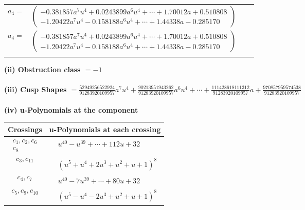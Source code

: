 \documentclass[1p]{elsarticle_modified}
\theoremstyle{definition}
\begin{document}
\begin{tabular}{m{7pt} m{180pt} m{7pt} m{180pt} }
\flushright $a_{4}=$&$\begin{pmatrix}-0.381857 a^{7} u^{4}+0.0243899 a^{6} u^{4}+\cdots+1.70012 a+0.510808\\-1.20422 a^{7} u^{4}-0.158188 a^{6} u^{4}+\cdots+1.44338 a-0.285170\end{pmatrix}$\\ \flushright $a_{4}=$&$\begin{pmatrix}-0.381857 a^{7} u^{4}+0.0243899 a^{6} u^{4}+\cdots+1.70012 a+0.510808\\-1.20422 a^{7} u^{4}-0.158188 a^{6} u^{4}+\cdots+1.44338 a-0.285170\end{pmatrix}$\\&\end{tabular}
\flushleft \textbf{(ii) Obstruction class $= -1$}\\~\\
\flushleft \textbf{(iii) Cusp Shapes $= \frac{52949256522924}{91283920109957} a^7 u^4+\frac{90213951943262}{91283920109957} a^6 u^4+\cdots+\frac{111428618111312}{91283920109957} a+\frac{970857959574538}{91283920109957}$}\\~\\
\newpage\renewcommand{\arraystretch}{1}
\flushleft \textbf{(iv) u-Polynomials at the component}\newline \\
\begin{tabular}{m{50pt}|m{274pt}}
Crossings & \hspace{64pt}u-Polynomials at each crossing \\
\hline $$\begin{aligned}c_{1},c_{2},c_{6}\\c_{8}\end{aligned}$$&$\begin{aligned}
&u^{40}- u^{39}+\cdots+112 u+32
\end{aligned}$\\
\hline $$\begin{aligned}c_{3},c_{11}\end{aligned}$$&$\begin{aligned}
&(u^5+u^4+2 u^3+u^2+u+1)^8
\end{aligned}$\\
\hline $$\begin{aligned}c_{4},c_{7}\end{aligned}$$&$\begin{aligned}
&u^{40}-7 u^{39}+\cdots+80 u+32
\end{aligned}$\\
\hline $$\begin{aligned}c_{5},c_{9},c_{10}\end{aligned}$$&$\begin{aligned}
&(u^5- u^4-2 u^3+u^2+u+1)^8
\end{aligned}$\\
\hline
\end{tabular}\\~\\
\end{document}
